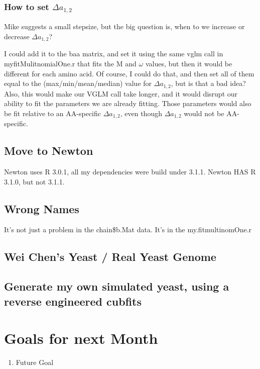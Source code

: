 \subsubsection{How to set $\Delta a_{1,2}$}

Mike suggests a small stepsize, but the big question is, when to we increase or decrease $\Delta a_{1,2}$?

I could add it to the baa matrix, and set it using the same vglm call in myfitMulitnomialOne.r that fits the M and $\omega$ values, but then it would be different for each amino acid. Of course, I could do that, and then set all of them equal to the (max/min/mean/median) value for $\Delta a_{1,2}$, but is that a bad idea? Also, this would make our VGLM call take longer, and it would disrupt our ability to fit the parameters we are already fitting. Those parameters would also be fit relative to an AA-specific $\Delta a_{1,2}$, even though $\Delta a_{1,2}$ would not be AA-specific.

\subsection{Move to Newton}

Newton uses R 3.0.1, all my dependencies were build under 3.1.1. Newton HAS R 3.1.0, but not 3.1.1.


\subsection{Wrong Names}

It's not just a problem in the chain\$b.Mat data. It's in the my.fitmultinomOne.r

\subsection{Wei Chen's Yeast / Real Yeast Genome}

\subsection{Generate my own simulated yeast, using a reverse engineered cubfits}



\section{Goals for next Month}
\begin{enumerate}
\item Future Goal
\end{enumerate}


